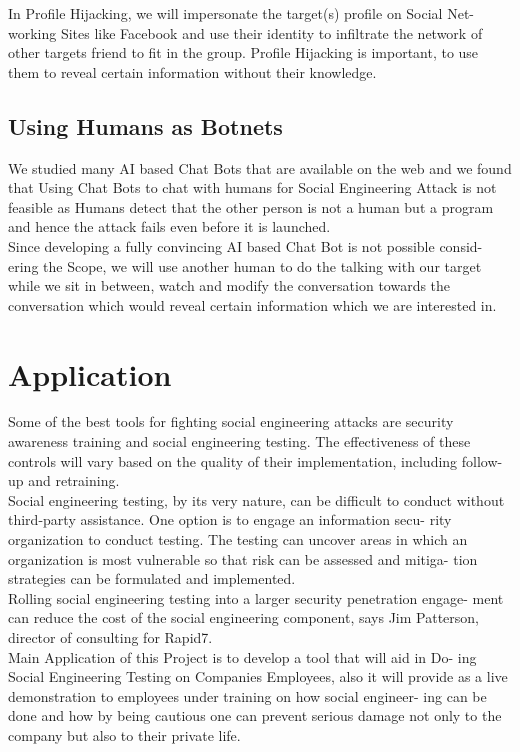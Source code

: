In Profile Hijacking, we will impersonate the target(s) profile on Social Net-
working Sites like Facebook and use their identity to infiltrate the network
of other targets friend to fit in the group. Profile Hijacking is important, to
use them to reveal certain information without their knowledge.\cite{paper_allyourcontacts}


\subsection{Using Humans as Botnets}

We studied many AI based Chat Bots that are available on the web and
we found that Using Chat Bots to chat with humans for Social Engineering Attack is not feasible as Humans detect that the other person is not a
human but a program and hence the attack fails even before it is launched.\cite{paper_towardsautomating}\\[0.5cm]
Since developing a fully convincing AI based Chat Bot is not possible consid-
ering the Scope, we will use another human to do the talking with our target
while we sit in between, watch and modify the conversation towards the
conversation which would reveal certain information which we are interested
in.\cite{paper_honeybot}


\section{Application}
Some of the best tools for fighting social engineering attacks are security
awareness training and social engineering testing. The effectiveness of these
controls will vary based on the quality of their implementation, including
follow-up and retraining.\\[0.5cm]
Social engineering testing, by its very nature, can be difficult to conduct
without third-party assistance. One option is to engage an information secu-
rity organization to conduct testing. The testing can uncover areas in which
an organization is most vulnerable so that risk can be assessed and mitiga-
tion strategies can be formulated and implemented.\\[0.5cm]
Rolling social engineering testing into a larger security penetration engage-
ment can reduce the cost of the social engineering component, says Jim
Patterson, director of consulting for Rapid7.\cite{link_humanweak}\\[0.5cm]
Main Application of this Project is to develop a tool that will aid in Do-
ing Social Engineering Testing on Companies Employees, also it will provide
as a live demonstration to employees under training on how social engineer-
ing can be done and how by being cautious one can prevent serious damage
not only to the company but also to their private life.\\[0.5cm]
